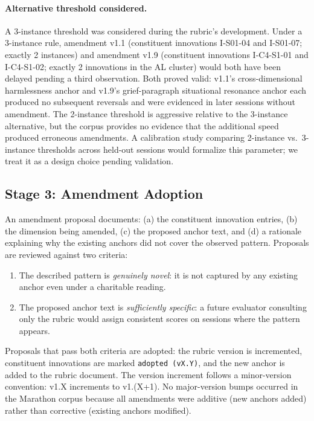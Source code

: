 \paragraph{Alternative threshold considered.}
A 3-instance threshold was considered during the rubric's development. Under a
3-instance rule, amendment v1.1 (constituent innovations I-S01-04 and I-S01-07;
exactly 2 instances) and amendment v1.9 (constituent innovations I-C4-S1-01 and
I-C4-S1-02; exactly 2 innovations in the AL cluster) would both have been delayed
pending a third observation. Both proved valid: v1.1's cross-dimensional harmlessness
anchor and v1.9's grief-paragraph situational resonance anchor each produced no
subsequent reversals and were evidenced in later sessions without amendment. The
2-instance threshold is aggressive relative to the 3-instance alternative, but the
corpus provides no evidence that the additional speed produced erroneous amendments.
A calibration study comparing 2-instance vs.\ 3-instance thresholds across held-out
sessions would formalize this parameter; we treat it as a design choice pending
validation.

\subsection{Stage 3: Amendment Adoption}

An amendment proposal documents: (a) the constituent innovation entries,
(b) the dimension being amended, (c) the proposed anchor text, and (d) a
rationale explaining why the existing anchors did not cover the observed pattern.
Proposals are reviewed against two criteria:

\begin{enumerate}
  \item The described pattern is \textit{genuinely novel}: it is not captured
        by any existing anchor even under a charitable reading.
  \item The proposed anchor text is \textit{sufficiently specific}: a future
        evaluator consulting only the rubric would assign consistent scores on
        sessions where the pattern appears.
\end{enumerate}

Proposals that pass both criteria are adopted: the rubric version is incremented,
constituent innovations are marked \texttt{adopted (vX.Y)}, and the new anchor
is added to the rubric document. The version increment follows a minor-version
convention: v1.X increments to v1.(X+1). No major-version bumps occurred in the
Marathon corpus because all amendments were additive (new anchors added) rather
than corrective (existing anchors modified).

